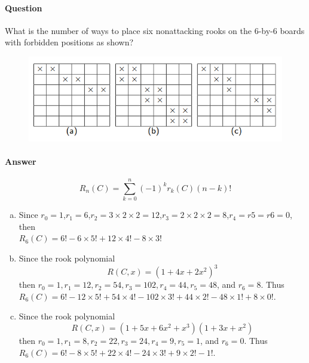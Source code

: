 \documentclass[UTF8]{article}
\begin{document}
    \paragraph{Question}
    What is the number of ways to place six nonattacking rooks on the 6-by-6 boards with forbidden positions as shown?
    \begin{figure}[ht]
        \centering
        \includegraphics[scale=0.6]{img/t41.png}
        \end{figure}
    
    \paragraph{Answer}
    \begin{center}
        $$ R_{n}(C) = \sum_{k = 0}^{n}{(-1)}^{k}r_{k}(C){(n - k)}! $$
        \begin{enumerate}[(a)]
            \item  Since $ r_{0} = 1 $,$ r_{1} = 6 $,$ r_{2} = 3 × 2 × 2 = 12 $,$ r_{3} = 2 × 2 × 2 = 8 $,$ r_{4} = r5 = r6 = 0 $, then \\
                $ R_{6}(C) = 6! − 6 × 5! + 12 × 4! − 8 × 3! $
            \item Since the rook polynomial \\
                $$ R(C,x) = (1 + 4x + 2x^{2})^{3} $$
                then $r_{0} = 1, r_{1} = 12, r_{2} = 54, r_{3} = 102, r_{4} = 44, r_{5} = 48$, and $r_{6} = 8$. Thus \\
                $ R_{6}(C) = 6! − 12 × 5! + 54 × 4! − 102 × 3! + 44 × 2! − 48 × 1! + 8 × 0! $.
            \item Since the rook polynomial \\
                $$ R(C,x) = (1 + 5x + 6x^{2} + x^{3})(1 + 3x + x^{2})$$
                then $r_{0} = 1, r_{1} = 8, r_{2} = 22, r_{3} = 24, r_{4} = 9, r_{5} = 1$, and $r_{6} = 0$. Thus \\
                $R_{6}(C) = 6! − 8 × 5! + 22 × 4! − 24 × 3! + 9 × 2! − 1!$.
        \end{enumerate}
    \end{center}
\end{document}

